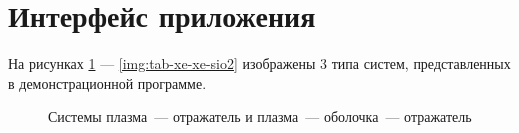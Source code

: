 
\section{Интерфейс приложения}

На рисунках \ref{img:xe-and-xe-sio2} — \ref{img:tab-xe-xe-sio2} изображены 3 типа систем, представленных в демонстрационной программе.

\begin{figure}[H]
	\captionsetup{justification=centering}
	\caption{Системы плазма~— отражатель и плазма~— оболочка~— отражатель}
	\label{img:xe-and-xe-sio2}
\end{figure}


